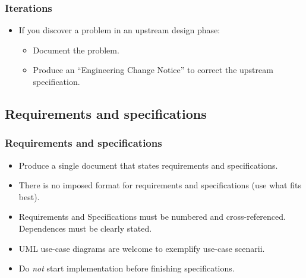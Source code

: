 \documentclass[10pt]{beamer}
\begin{document}
\begin{frame}
  \frametitle{Iterations}
  \begin{itemize}
    \item If you discover a problem in an upstream design phase:
      \begin{itemize}
      \item Document the problem.
      \item Produce an ``Engineering Change Notice'' to correct
        the upstream specification.
      \end{itemize}
  \end{itemize}
\end{frame}

\subsection{Requirements and specifications}
\begin{frame}
  \frametitle{Requirements and specifications}
  \begin{itemize}
  \item Produce a single document that states requirements and specifications.
  \item There is no imposed format for requirements and specifications (use what
    fits best).
  \item Requirements and Specifications must be numbered and cross-referenced.
    Dependences must be clearly stated.
  \item UML use-case diagrams are welcome to exemplify use-case scenarii.
  \item Do \emph{not} start implementation before finishing specifications.
  \end{itemize}
\end{frame}
\end{document}
